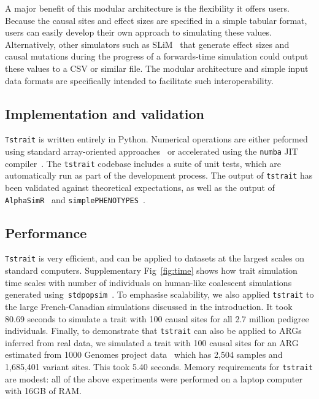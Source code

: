 \documentclass[unnumsec,webpdf,modern,large,namedate]{oup-authoring-template}%
\begin{document}
A major benefit of this modular architecture is the flexibility it offers
users. Because the causal sites and effect sizes are specified in a
simple tabular format, users can easily develop their own approach
to simulating these values. Alternatively, other simulators
such as SLiM~\citep{haller2023} that generate effect sizes and
causal mutations during the progress of a forwards-time simulation
could output these
values to a CSV or similar file. The modular architecture  and simple
input data formats are specifically intended to facilitate such
interoperability.

\subsection{Implementation and validation}
\texttt{Tstrait} is written entirely in Python. Numerical operations
are either peformed using standard array-oriented
approaches~\citep{numpy} or accelerated
using the \texttt{numba} JIT compiler~\citep{numba}.
The \texttt{tstrait} codebase includes a suite of unit tests,
which are automatically run as part of the development process. The
output of \texttt{tstrait} has been validated against
theoretical expectations, as well as the output
of \texttt{AlphaSimR}~\citep{gaynor2021} and
\texttt{simplePHENOTYPES}~\citep{fernandes2020}.

\subsection{Performance}
\texttt{Tstrait} is very efficient, and can be applied to datasets at the
largest scales on standard computers.
Supplementary Fig~\ref{fig:time} shows how trait simulation time scales
with number of individuals on human-like coalescent simulations
generated using~\texttt{stdpopsim}~\citep{adrion2020}.
To emphasise scalability, we also
applied \texttt{tstrait} to the large
French-Canadian simulations discussed in the introduction.
It took 80.69 seconds to simulate a trait with 100 causal sites
for all 2.7 million pedigree individuals.
Finally, to demonstrate that \texttt{tstrait} can also be applied
to ARGs inferred from real data, we simulated a trait with 100 causal
sites for an ARG estimated from 1000 Genomes project
data~\citep{kelleher2019} which has 2,504 samples
and 1,685,401 variant sites. This took 5.40 seconds.
Memory requirements for \texttt{tstrait} are modest: all of the
above experiments were performed on a laptop computer with 16GB of RAM.
\end{document}
